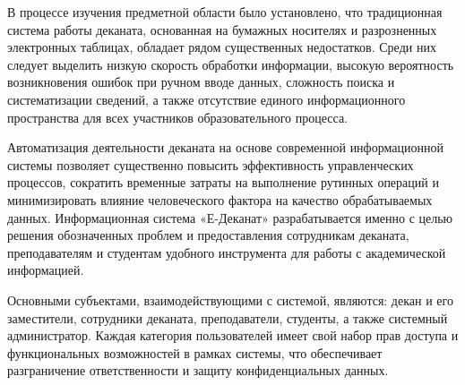 \documentclass[14pt, a4paper]{extreport}
\begin{document}
В процессе изучения предметной области было установлено, что традиционная система работы деканата, основанная на бумажных носителях и разрозненных электронных таблицах, обладает рядом существенных недостатков. Среди них следует выделить низкую скорость обработки информации, высокую вероятность возникновения ошибок при ручном вводе данных, сложность поиска и систематизации сведений, а также отсутствие единого информационного пространства для всех участников образовательного процесса.

Автоматизация деятельности деканата на основе современной информационной системы позволяет существенно повысить эффективность управленческих процессов, сократить временные затраты на выполнение рутинных операций и минимизировать влияние человеческого фактора на качество обрабатываемых данных. Информационная система «Е-Деканат» разрабатывается именно с целью решения обозначенных проблем и предоставления сотрудникам деканата, преподавателям и студентам удобного инструмента для работы с академической информацией.

Основными субъектами, взаимодействующими с системой, являются: декан и его заместители, сотрудники деканата, преподаватели, студенты, а также системный администратор. Каждая категория пользователей имеет свой набор прав доступа и функциональных возможностей в рамках системы, что обеспечивает разграничение ответственности и защиту конфиденциальных данных.
\end{document}
